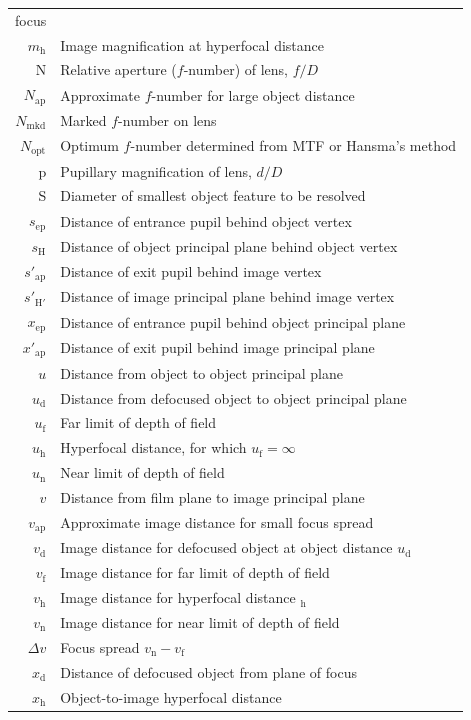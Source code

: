 \documentclass[11pt, oneside]{scrartcl}   	%
\newcommand{\Dv}{\ensuremath{\Delta v}}
\begin{document}
\begin{center}
{\begin{tabular}{r@{~=~}l}
     focus      \\
$m_\mathrm{h}$ & Image magnification at hyperfocal distance     \\
N & Relative aperture ($f$-number) of lens, $f/D$     \\
$N_\mathrm{ap}$ & Approximate $f$-number for large object distance     \\
$N_\mathrm{mkd}$ & Marked $f$-number on lens     \\
$N_\mathrm{opt}$ & Optimum $f$-number determined from MTF or Hansma’s method     \\
p & Pupillary magnification of lens, $d/D$     \\
S & Diameter of smallest object feature to be resolved      \\
$s_\mathrm{ep}$ & Distance of entrance pupil behind object vertex     \\
$s_\mathrm{H}$ & Distance of object principal plane behind object vertex      \\
$s'_\mathrm{ap}$ & Distance of exit pupil behind image vertex     \\
$s'_\mathrm{H'}$ & Distance of image principal plane behind image vertex     \\
$x_\mathrm{ep}$& Distance of entrance pupil behind object principal plane      \\
$x'_\mathrm{ap}$ & Distance of exit pupil behind image principal plane     \\
$u$ & Distance from object to object principal plane     \\
$u_\mathrm{d}$ & Distance from defocused object to object principal plane     \\
$u_\mathrm{f}$ & Far limit of depth of field     \\
$u_\mathrm{h}$ & Hyperfocal distance, for which $u_\mathrm{f} = \infty$      \\
$u_\mathrm{n}$ & Near limit of depth of field     \\
$v$ & Distance from film plane to image principal plane      \\
$v_\mathrm{ap}$ & Approximate image distance for small focus spread     \\
$v_\mathrm{d}$ & Image distance for defocused object at object distance $u_\mathrm{d}$      \\
$v_\mathrm{f}$ & Image distance for far limit of depth of field     \\
$v_\mathrm{h}$ & Image distance for hyperfocal distance $_\mathrm{h}$     \\
$v_\mathrm{n}$ & Image distance for near limit of depth of field      \\
$\Dv$ & Focus spread $v_\mathrm{n} - v_\mathrm{f}$     \\
$x_\mathrm{d}$ & Distance of defocused object from plane of focus      \\
$x_\mathrm{h}$ & Object-to-image hyperfocal distance     \\
\end{tabular}
}
\end{center}
\end{document}
